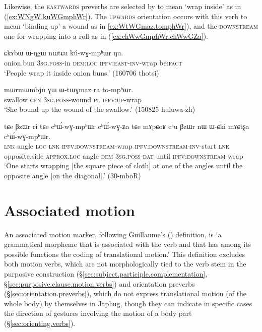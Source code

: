 Likewise, the \textsc{eastwards} preverbs are selected by  to mean `wrap inside' as in (\ref{ex:WNgW.kuWGmphWr}). The  \textsc{upwards} orientation occurs with this verb to mean `binding up' a wound as in \ref{ex:WtWGmaz.tomphWr}), and the \textsc{downstream} one for wrapping into a roll as in (\ref{ex:chWwGmphWr.chWwGZa}).
 
\begin{exe}
\ex \label{ex:WNgW.kuWGmphWr}
\gll  ɕkɤbɯ ɯ-ŋgɯ nɯtɕu kú-wɣ-mpʰɯr ŋu. \\
onion.bun \textsc{3sg}.\textsc{poss}-in \textsc{dem}:\textsc{loc} \textsc{ipfv}:\textsc{east}-\textsc{inv}-wrap be:\textsc{fact} \\
\glt `People wrap it inside onion buns.' (160706 thotsi)
 \end{exe}

\begin{exe}
\ex \label{ex:WtWGmaz.tomphWr}
\gll mɯrmɯmbju ɣɯ ɯ-tɯɣmaz ra to-mpʰɯr. \\
swallow \textsc{gen} \textsc{3sg}.\textsc{poss}-wound \textsc{pl} \textsc{ipfv}:\textsc{up}-wrap \\
\glt `She bound up the wound of the swallow.' (150825 huluwa-zh)
  \end{exe}
  
\begin{exe}
\ex \label{ex:chWwGmphWr.chWwGZa}
\gll  tɕe βzɯr ri tɕe cʰɯ́-wɣ-mpʰɯr cʰɯ́-wɣ-ʑa tɕe  mɤpɕoʁ cʰu βzɯr nɯ ɯ-ɕki mɤɕtʂa cʰɯ́-wɣ-mpʰɯr. \\
\textsc{lnk} angle \textsc{loc} \textsc{lnk} \textsc{ipfv}:\textsc{downstream}-wrap \textsc{ipfv}:\textsc{downstream}-\textsc{inv}-start \textsc{lnk} opposite.side \textsc{approx}.\textsc{loc} angle \textsc{dem} \textsc{3sg}.\textsc{poss}-\textsc{dat} until \textsc{ipfv}:\textsc{downstream}-wrap \\
\glt `One starts wrapping [the square piece of cloth] at one of the angles until the opposite angle [on the diagonal].' (30-mboR)
 \end{exe}
  
\section{Associated motion} \label{sec:associated.motion}
An associated motion marker, following Guillaume's (\citeyear[13]{guillaume16am}) definition, is `a grammatical morpheme that is associated with the verb and that has among its possible functions the coding of translational motion.' This definition excludes both motion verbs, which are not morphologically tied to the verb stem in the purposive construction (§\ref{sec:subject.participle.complementation}, §\ref{sec:purposive.clause.motion.verbs}) and orientation preverbs (§\ref{sec:orientation.preverbs}), which do not express translational motion (of the whole body) by themselves in Japhug, though they can indicate in specific cases the direction of gestures involving the motion of a body part (§\ref{sec:orienting.verbs}).


